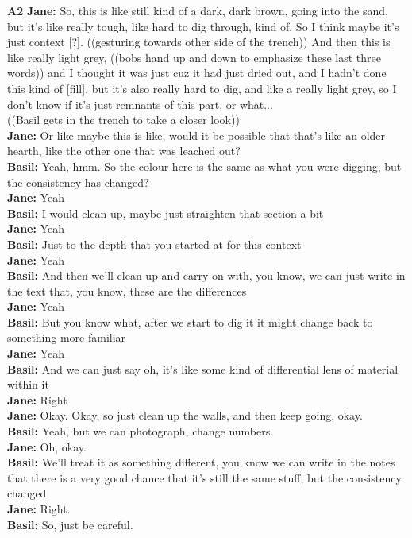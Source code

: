 \documentclass{article}
\begin{document}
\noindent\textbf{A2}\label{sec-A2}\newline
\textbf{Jane:} So, this is like still kind of a dark, dark brown, going
into the sand, but it's like really tough, like hard to dig through,
kind of. So I think maybe it's just context {[}?{]}. ((gesturing towards
other side of the trench)) And then this is like really light grey,
((bobs hand up and down to emphasize these last three words)) and I
thought it was just cuz it had just dried out, and I hadn't done this
kind of {[}fill{]}, but it's also really hard to dig, and like a really
light grey, so I don't know if it's just remnants of this part, or
what...\\
((Basil gets in the trench to take a closer look))\\
\textbf{Jane:} Or like maybe this is like, would it be possible that
that's like an older hearth, like the other one that was leached out?\\
\textbf{Basil:} Yeah, hmm. So the colour here is the same as what you
were digging, but the consistency has changed?\\
\textbf{Jane:} Yeah\\
\textbf{Basil:} I would clean up, maybe just straighten that section a
bit\\
\textbf{Jane:} Yeah\\
\textbf{Basil:} Just to the depth that you started at for this context\\
\textbf{Jane:} Yeah\\
\textbf{Basil:} And then we'll clean up and carry on with, you know, we
can just write in the text that, you know, these are the differences\\
\textbf{Jane:} Yeah\\
\textbf{Basil:} But you know what, after we start to dig it it might
change back to something more familiar\\
\textbf{Jane:} Yeah\\
\textbf{Basil:} And we can just say oh, it's like some kind of
differential lens of material within it\\
\textbf{Jane:} Right\\
\textbf{Jane:} Okay. Okay, so just clean up the walls, and then keep
going, okay.\\
\textbf{Basil:} Yeah, but we can photograph, change numbers.\\
\textbf{Jane:} Oh, okay.\\
\textbf{Basil:} We'll treat it as something different, you know we can
write in the notes that there is a very good chance that it's still the
same stuff, but the consistency changed\\
\textbf{Jane:} Right.\\
\textbf{Basil:} So, just be careful.\newline
\end{document}
